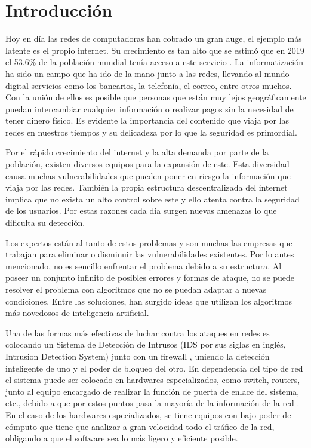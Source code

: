 \chapter*{Introducción}\label{chapter:introduction}

Hoy en día las redes de computadoras han cobrado un gran auge, el ejemplo más latente es el propio internet. Su crecimiento es tan alto que se estimó que en 2019 el 53.6\% de la población mundial tenía acceso a este servicio \cite{internetAcces}. La informatización ha sido un campo que ha ido de la mano junto a las redes, llevando al mundo digital servicios como los bancarios, la telefonía, el correo, entre otros muchos. Con la unión de ellos es posible que personas que están muy lejos geográficamente puedan intercambiar cualquier información o realizar pagos sin la necesidad de tener dinero físico. Es evidente la importancia del contenido que viaja por las redes en nuestros tiempos y su delicadeza por lo que la seguridad es primordial.

Por el rápido crecimiento del internet y la alta demanda por parte de la población, existen diversos equipos para la expansión de este. Esta diversidad causa muchas vulnerabilidades que pueden poner en riesgo la información que viaja por las redes. También la propia estructura descentralizada del internet implica que no exista un alto control sobre este y ello atenta contra la seguridad de los usuarios. Por estas razones cada día surgen nuevas amenazas lo que dificulta su detección.

Los expertos están al tanto de estos problemas y son muchas las empresas que trabajan para eliminar o disminuir las vulnerabilidades existentes. Por lo antes mencionado, no es sencillo enfrentar el problema debido a su estructura. Al poseer un conjunto infinito de posibles errores y formas de ataque, no se puede resolver el problema con algoritmos que no se puedan adaptar a nuevas condiciones. Entre las soluciones, han surgido ideas que utilizan los algoritmos más novedosos de inteligencia artificial.

Una de las formas más efectivas de luchar contra los ataques en redes es colocando un Sistema de Detección de Intrusos \cite{scarfone2012guide} (IDS por sus siglas en inglés, Intrusion Detection System) junto con un firewall \cite{wack2002guidelines}, uniendo la detección inteligente de uno y el poder de bloqueo del otro. En dependencia del tipo de red el sistema puede ser colocado en hardwares especializados, como switch, routers, junto al equipo encargado de realizar la función de puerta de enlace del sistema,  etc., debido a que por estos puntos pasa la mayoría de la información de la red \cite{tanenbaum1996sistemas}. En el caso de los hardwares especializados, se tiene equipos con bajo poder de cómputo que tiene que analizar a gran velocidad todo el tráfico de la red, obligando a que el software sea lo más ligero y eficiente posible.

